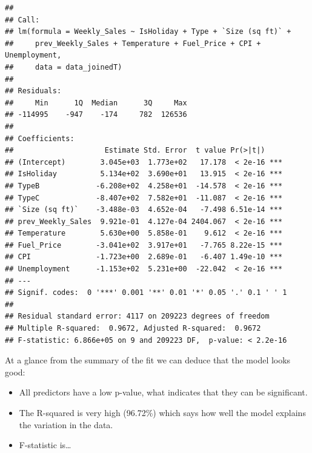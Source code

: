 \documentclass[11pt,]{article}
\newenvironment{Shaded}{\begin{snugshade}}{\end{snugshade}}
\newcommand{\KeywordTok}[1]{\textcolor[rgb]{0.13,0.29,0.53}{\textbf{{#1}}}}
\newcommand{\DataTypeTok}[1]{\textcolor[rgb]{0.13,0.29,0.53}{{#1}}}
\newcommand{\StringTok}[1]{\textcolor[rgb]{0.31,0.60,0.02}{{#1}}}
\newcommand{\CommentTok}[1]{\textcolor[rgb]{0.56,0.35,0.01}{\textit{{#1}}}}
\newcommand{\NormalTok}[1]{{#1}}
\begin{document}
\begin{Shaded}
\end{Shaded}

\begin{verbatim}
## 
## Call:
## lm(formula = Weekly_Sales ~ IsHoliday + Type + `Size (sq ft)` + 
##     prev_Weekly_Sales + Temperature + Fuel_Price + CPI + Unemployment, 
##     data = data_joinedT)
## 
## Residuals:
##     Min      1Q  Median      3Q     Max 
## -114995    -947    -174     782  126536 
## 
## Coefficients:
##                     Estimate Std. Error  t value Pr(>|t|)    
## (Intercept)        3.045e+03  1.773e+02   17.178  < 2e-16 ***
## IsHoliday          5.134e+02  3.690e+01   13.915  < 2e-16 ***
## TypeB             -6.208e+02  4.258e+01  -14.578  < 2e-16 ***
## TypeC             -8.407e+02  7.582e+01  -11.087  < 2e-16 ***
## `Size (sq ft)`    -3.488e-03  4.652e-04   -7.498 6.51e-14 ***
## prev_Weekly_Sales  9.921e-01  4.127e-04 2404.067  < 2e-16 ***
## Temperature        5.630e+00  5.858e-01    9.612  < 2e-16 ***
## Fuel_Price        -3.041e+02  3.917e+01   -7.765 8.22e-15 ***
## CPI               -1.723e+00  2.689e-01   -6.407 1.49e-10 ***
## Unemployment      -1.153e+02  5.231e+00  -22.042  < 2e-16 ***
## ---
## Signif. codes:  0 '***' 0.001 '**' 0.01 '*' 0.05 '.' 0.1 ' ' 1
## 
## Residual standard error: 4117 on 209223 degrees of freedom
## Multiple R-squared:  0.9672, Adjusted R-squared:  0.9672 
## F-statistic: 6.866e+05 on 9 and 209223 DF,  p-value: < 2.2e-16
\end{verbatim}

At a glance from the summary of the fit we can deduce that the model
looks good:

\begin{itemize}
\item
  All predictors have a low p-value, what indicates that they can be
  significant.
\item
  The R-squared is very high (96.72\%) which says how well the model
  explains the variation in the data.
\item
  F-statistic is\ldots{}
\end{itemize}
\end{document}
